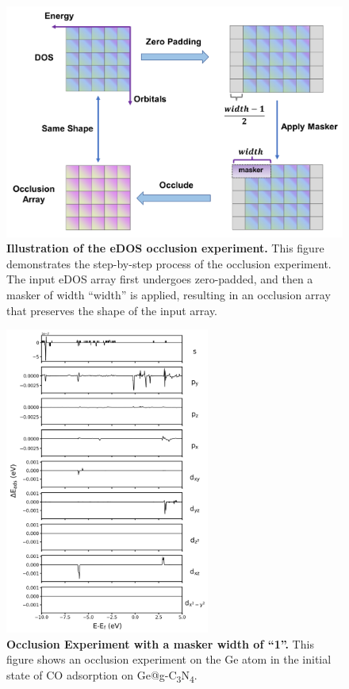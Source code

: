 \begin{figure}[htbp]
  \centering
  \includegraphics[width=\textwidth]{supp_fig21_occlusion.png}
  \caption{\textbf{Illustration of the eDOS occlusion experiment.}
  This figure demonstrates the step-by-step process of the occlusion experiment.
  The input eDOS array first undergoes zero-padded, and then a masker of width ``width'' is applied,
  resulting in an occlusion array that preserves the shape of the input array.}
  \label{supp_fig21:occlusion}
\end{figure}

\begin{figure}[htbp]
  \centering
  \includegraphics[width=0.6\textwidth]{supp_fig22_occl_wid1.png}
  \caption{\textbf{Occlusion Experiment with a masker width of ``1''.}
  This figure shows an occlusion experiment on the Ge atom in
  the initial state of CO adsorption on Ge@g-C\textsubscript{3}N\textsubscript{4}.}
  \label{supp_fig22:occl_wid1}
\end{figure}

